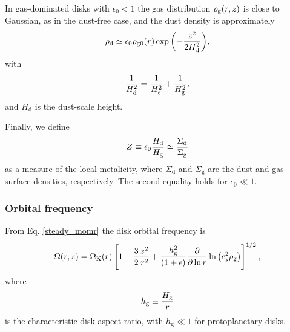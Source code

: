 In gas-dominated disks with $\epsilon_0 < 1$ the gas distribution
$\rho_\mathrm{g}(r,z)$ is close to Gaussian, as in the   
dust-free case, and the dust density is approximately 
\begin{align}
  \rho_\mathrm{d} \simeq \epsilon_0\rho_\mathrm{g0}(r) \exp
        {\left(-\frac{z^2}{2H_\mathrm{d}^2}\right)}, 
\end{align}
with 
\begin{align}
  \frac{1}{H_\mathrm{d}^2} = \frac{1}{H_\epsilon^2} + \frac{1}{H_\mathrm{g}^2}, 
\end{align}
and $H_\mathrm{d}$ is the dust-scale height.%

Finally, we define 
\begin{align}
  Z \equiv \epsilon_0\frac{H_\mathrm{d}}{H_\mathrm{g}} \simeq
  \frac{\Sigma_\mathrm{d}}{\Sigma_\mathrm{g}} 
\end{align}
as a measure of the local metalicity, where $\Sigma_\mathrm{d}$ and
$\Sigma_\mathrm{g}$ are the dust and gas surface densities,
respectively. The second equality holds for $\epsilon_0\ll1$.  


\subsubsection{Orbital frequency} 
From Eq. \ref{steady_momr} the disk orbital frequency is 
\begin{align}
  \Omega(r,z) = \Omega_{\rm K}(r)\left[1 - \frac{3}{2}\frac{z^2}{r^2} +
    \frac{h_\mathrm{g}^2}{\left(1+\epsilon\right)}\frac{\partial}{\partial\ln{r}}\ln{\left(c_s^2\rho_\mathrm{g}\right)}
    \right]^{1/2}, 
\end{align}
where 
\begin{align}
  h_\mathrm{g} \equiv \frac{H_\mathrm{g}}{r}
\end{align}
is the characteristic disk aspect-ratio, with $h_\mathrm{g}\ll 1$ for protoplanetary disks. 

